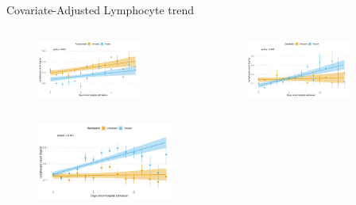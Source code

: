 \documentclass[compress,ignorenonframetext,aspectratio=1610,handout]{beamer}
\begin{document}
\begin{frame}{Covariate-Adjusted Lymphocyte trend}
	\begin{columns}
		\begin{figure}
			\includegraphics[width=0.8\textwidth]{figs/results/db00695_furosemide_lymphocite_progression.pdf}	
		\end{figure}

		\begin{figure}
			\includegraphics[width=0.8\textwidth]{figs/results/db00146_calcifediol_lymphocite_progression.pdf}	
		\end{figure}

	\end{columns}

	\begin{figure}
		\includegraphics[width=0.4\textwidth]{figs/results/db09258_bemiparin_lymphocite_progression.pdf}	
	\end{figure}


\end{frame}
\end{document}

